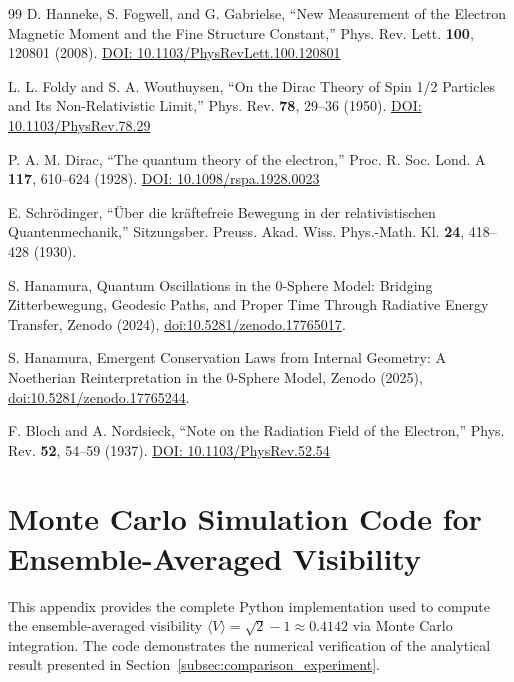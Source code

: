 \documentclass[%
 reprint,
 amsmath,amssymb,
 aps,
 prb,
]{revtex4-2}
\numberwithin{equation}{section}
\begin{document}
\begin{thebibliography}{99}
D. Hanneke, S. Fogwell, and G. Gabrielse, ``New Measurement of the Electron Magnetic Moment and the Fine Structure Constant,'' Phys. Rev. Lett. \textbf{100}, 120801 (2008). \href{https://doi.org/10.1103/PhysRevLett.100.120801}{DOI: 10.1103/PhysRevLett.100.120801}

L. L. Foldy and S. A. Wouthuysen, ``On the Dirac Theory of Spin 1/2 Particles and Its Non-Relativistic Limit,'' Phys. Rev. \textbf{78}, 29--36 (1950). \href{https://doi.org/10.1103/PhysRev.78.29}{DOI: 10.1103/PhysRev.78.29}

P. A. M. Dirac, ``The quantum theory of the electron,'' Proc. R. Soc. Lond. A \textbf{117}, 610--624 (1928). \href{https://doi.org/10.1098/rspa.1928.0023}{DOI: 10.1098/rspa.1928.0023}

E. Schr\"{o}dinger, ``\"{U}ber die kr\"{a}ftefreie Bewegung in der relativistischen Quantenmechanik,'' Sitzungsber. Preuss. Akad. Wiss. Phys.-Math. Kl. \textbf{24}, 418--428 (1930).

S. Hanamura, Quantum Oscillations in the 0-Sphere Model: Bridging Zitterbewegung, Geodesic Paths, and Proper Time Through Radiative Energy Transfer, Zenodo (2024), \href{https://doi.org/10.5281/zenodo.17765017}{doi:10.5281/zenodo.17765017}.

S. Hanamura, Emergent Conservation Laws from Internal Geometry: A Noetherian Reinterpretation in the 0-Sphere Model, Zenodo (2025), \href{https://doi.org/10.5281/zenodo.17765244}{doi:10.5281/zenodo.17765244}.

F. Bloch and A. Nordsieck,
``Note on the Radiation Field of the Electron,''
Phys. Rev. \textbf{52}, 54--59 (1937).
\href{https://doi.org/10.1103/PhysRev.52.54}{DOI: 10.1103/PhysRev.52.54}

\end{thebibliography}

\appendix

\section{Monte Carlo Simulation Code for Ensemble-Averaged Visibility}
\label{app:monte_carlo}

This appendix provides the complete Python implementation used to compute the ensemble-averaged visibility $\langle V \rangle = \sqrt{2}-1 \approx 0.4142$ via Monte Carlo integration. The code demonstrates the numerical verification of the analytical result presented in Section~\ref{subsec:comparison_experiment}.
\end{document}
